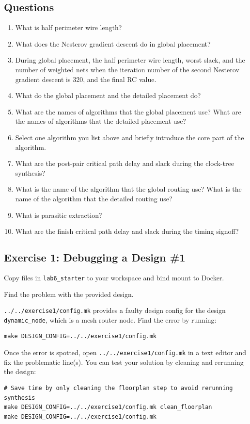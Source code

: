 \documentclass[a4paper,12pt,twoside]{article}
\begin{document}
\subsection{Questions}
\begin{enumerate}
    \item What is half perimeter wire length?
    \item What does the Nesterov gradient descent do in global placement?
    \item During global placement, the half perimeter wire length, worst slack, and the number of weighted nets when the iteration number of the second Nesterov gradient descent is 320, and the final RC value.
    \item What do the global placement and the detailed placement do?
    \item What are the names of algorithms that the global placement use? What are the names of algorithms that the detailed placement use?
    \item Select one algorithm you list above and briefly introduce the core part of the algorithm.
    \item What are the post-pair critical path delay and slack during the clock-tree synthesis?
    \item What is the name of the algorithm that the global routing use? What is the name of the algorithm that the detailed routing use?
    \item What is parasitic extraction?
    \item What are the finish critical path delay and slack during the timing signoff?
\end{enumerate}
\subsection{Exercise 1: Debugging a Design \#1}\label{SE1}
Copy files in \texttt{lab6\_starter} to your workspace and bind mount to Docker.

Find the problem with the provided design.

\texttt{../../exercise1/config.mk} provides a faulty design config for the design \texttt{dynamic\_node}, which is a mesh router node. Find the error by running:
\begin{verbatim}
make DESIGN_CONFIG=../../exercise1/config.mk
\end{verbatim}
Once the error is spotted, open \texttt{../../exercise1/config.mk} in a text editor and fix the problematic line(s). You can test your solution by cleaning and rerunning the design:
\begin{verbatim}
# Save time by only cleaning the floorplan step to avoid rerunning synthesis
make DESIGN_CONFIG=../../exercise1/config.mk clean_floorplan
make DESIGN_CONFIG=../../exercise1/config.mk
\end{verbatim}
\end{document}
